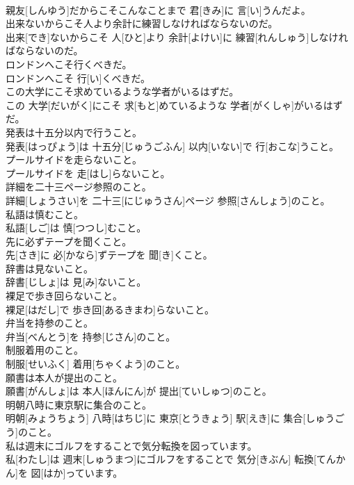 \documentclass[8pt]{extreport}
\begin{document}
\begin{CJK}{UTF8}{min}
\\	親友[しんゆう]だからこそこんなことまで 君[きみ]に 言[い]うんだよ。
\\	出来ないからこそ人より余計に練習しなければならないのだ。	
\\	出来[でき]ないからこそ 人[ひと]より 余計[よけい]に 練習[れんしゅう]しなければならないのだ。
\\	ロンドンへこそ行くべきだ。	
\\	ロンドンへこそ 行[い]くべきだ。
\\	この大学にこそ求めているような学者がいるはずだ。	
\\	この 大学[だいがく]にこそ 求[もと]めているような 学者[がくしゃ]がいるはずだ。
\\	発表は十五分以内で行うこと。	
\\	発表[はっぴょう]は 十五分[じゅうごふん] 以内[いない]で 行[おこな]うこと。
\\	プールサイドを走らないこと。	
\\	プールサイドを 走[はし]らないこと。
\\	詳細を二十三ページ参照のこと。	
\\	詳細[しょうさい]を 二十三[にじゅうさん]ページ 参照[さんしょう]のこと。
\\	私語は慎むこと。	
\\	私語[しご]は 慎[つつし]むこと。
\\	先に必ずテープを聞くこと。	
\\	先[さき]に 必[かなら]ずテープを 聞[き]くこと。
\\	辞書は見ないこと。	
\\	辞書[じしょ]は 見[み]ないこと。
\\	裸足で歩き回らないこと。	
\\	裸足[はだし]で 歩き回[あるきまわ]らないこと。
\\	弁当を持参のこと。	
\\	弁当[べんとう]を 持参[じさん]のこと。
\\	制服着用のこと。	
\\	制服[せいふく] 着用[ちゃくよう]のこと。
\\	願書は本人が提出のこと。	
\\	願書[がんしょ]は 本人[ほんにん]が 提出[ていしゅつ]のこと。
\\	明朝八時に東京駅に集合のこと。	
\\	明朝[みょうちょう] 八時[はちじ]に 東京[とうきょう] 駅[えき]に 集合[しゅうごう]のこと。
\\	私は週末にゴルフをすることで気分転換を図っています。	
\\	私[わたし]は 週末[しゅうまつ]にゴルフをすることで 気分[きぶん] 転換[てんかん]を 図[はか]っています。

\end{CJK}
\end{document}
